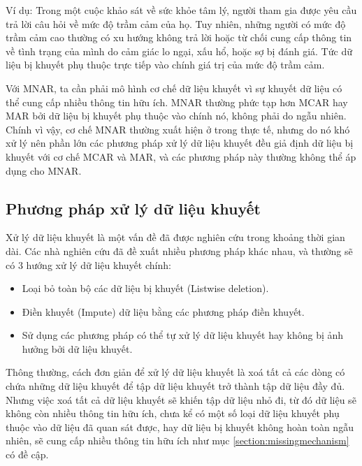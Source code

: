 \begin{itemize}
    Ví dụ: Trong một cuộc khảo sát về sức khỏe tâm lý, người tham gia được yêu cầu trả lời câu hỏi về mức độ trầm cảm của họ. Tuy nhiên, những người có mức độ trầm cảm cao thường có xu hướng không trả lời hoặc từ chối cung cấp thông tin về tình trạng của mình do cảm giác lo ngại, xấu hổ, hoặc sợ bị đánh giá. Tức dữ liệu bị khuyết phụ thuộc trực tiếp vào chính giá trị của mức độ trầm cảm.

\end{itemize}

Với MNAR, ta cần phải mô hình cơ chế dữ liệu khuyết vì sự khuyết dữ liệu có thể cung cấp nhiều thông tin hữu ích.
MNAR thường phức tạp hơn MCAR hay MAR bởi dữ liệu bị khuyết phụ thuộc vào chính nó, không phải do ngẫu nhiên. Chính vì vậy, cơ chế MNAR thường xuất hiện ở trong thực tế, nhưng do nó khó xử lý nên phần lớn các phương pháp xử lý dữ liệu khuyết đều giả định dữ liệu bị khuyết với cơ chế MCAR và MAR, và các phương pháp này thường không thể áp dụng cho MNAR.


\subsection{Phương pháp xử lý dữ liệu khuyết}
Xử lý dữ liệu khuyết là một vấn đề đã được nghiên cứu trong khoảng thời gian dài. Các nhà nghiên cứu đã đề xuất nhiều phương pháp khác nhau, và thường sẽ có 3 hướng xử lý dữ liệu khuyết chính:
\begin{itemize}
    \item Loại bỏ toàn bộ các dữ liệu bị khuyết (Listwise deletion).
    \item Điền khuyết (Impute) dữ liệu bằng các phương pháp điền khuyết.
    \item Sử dụng các phương pháp có thể tự xử lý dữ liệu khuyết hay không bị ảnh hưởng bởi dữ liệu khuyết.
\end{itemize}


Thông thường, cách đơn giản để xử lý dữ liệu khuyết là xoá tất cả các dòng có chứa những dữ liệu khuyết để tập dữ liệu khuyết trở thành tập dữ liệu đầy đủ. 
Nhưng việc xoá tất cả dữ liệu khuyết sẽ khiến tập dữ liệu nhỏ đi, từ đó dữ liệu sẽ không còn nhiều thông tin hữu ích, chưa kể có một số loại dữ liệu khuyết phụ thuộc vào dữ liệu đã quan sát được, hay dữ liệu bị khuyết không hoàn toàn ngẫu nhiên, sẽ cung cấp nhiều thông tin hữu ích như mục \ref{section:missingmechanism} có đề cập.

